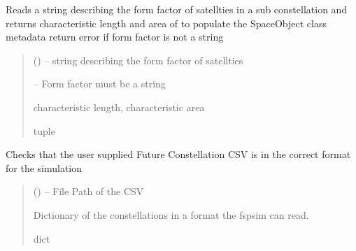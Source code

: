 \documentclass[letterpaper,10pt,english]{sphinxmanual}
\begin{document}
\begin{fulllineitems}
\label{\detokenize{fspsim.utils:fspsim.utils.Formatting.calculate_form_factor}}
\pysigstartsignatures
{}
\pysigstopsignatures
\sphinxAtStartPar
Reads a string describing the form factor of satellties in a sub constellation and
returns characteristic length and area of to populate the SpaceObject class metadata
return error if form factor is not a string
\begin{quote}\begin{description}
\sphinxAtStartPar
{} () – string describing the form factor of satellties

\sphinxAtStartPar
{} – Form factor must be a string

\sphinxAtStartPar
characteristic length, characteristic area

\sphinxAtStartPar
tuple

\end{description}\end{quote}

\end{fulllineitems}


\begin{fulllineitems}
\label{\detokenize{fspsim.utils:fspsim.utils.Formatting.future_constellations_csv_handler}}
\pysigstartsignatures
{}
\pysigstopsignatures
\sphinxAtStartPar
Checks that the user supplied Future Constellation CSV is in the correct format for the simulation
\begin{quote}\begin{description}
\sphinxAtStartPar
{} () – File Path of the CSV

\sphinxAtStartPar
Dictionary of the constellations in a format the fspsim can read.

\sphinxAtStartPar
dict

\end{description}\end{quote}

\end{fulllineitems}
\end{document}
